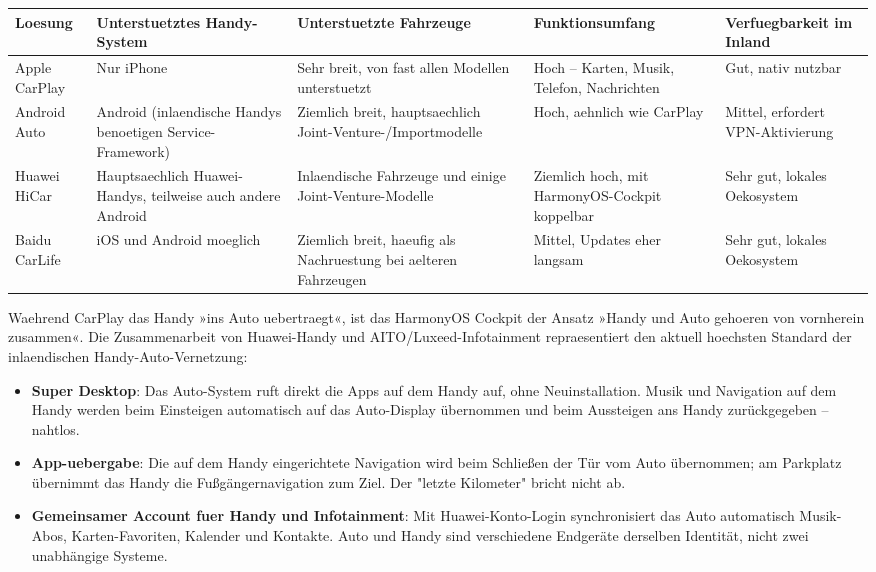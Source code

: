 \begin{center}
\begin{tabularx}{\linewidth}{|X|X|X|X|X|}
\hline
\textbf{Loesung} & \textbf{Unterstuetztes Handy-System} & \textbf{Unterstuetzte Fahrzeuge} & \textbf{Funktionsumfang} & \textbf{Verfuegbarkeit im Inland} \tabularnewline
\hline
Apple CarPlay & Nur iPhone & Sehr breit, von fast allen Modellen unterstuetzt & Hoch – Karten, Musik, Telefon, Nachrichten & Gut, nativ nutzbar \tabularnewline
Android Auto & Android (inlaendische Handys benoetigen Service-Framework) & Ziemlich breit, hauptsaechlich Joint-Venture-/Importmodelle & Hoch, aehnlich wie CarPlay & Mittel, erfordert VPN-Aktivierung \tabularnewline
Huawei HiCar & Hauptsaechlich Huawei-Handys, teilweise auch andere Android & Inlaendische Fahrzeuge und einige Joint-Venture-Modelle & Ziemlich hoch, mit HarmonyOS-Cockpit koppelbar & Sehr gut, lokales Oekosystem \tabularnewline
Baidu CarLife & iOS und Android moeglich & Ziemlich breit, haeufig als Nachruestung bei aelteren Fahrzeugen & Mittel, Updates eher langsam & Sehr gut, lokales Oekosystem \tabularnewline
\hline
\end{tabularx}
\end{center}


Waehrend CarPlay das Handy »ins Auto uebertraegt«, ist das HarmonyOS Cockpit der Ansatz »Handy und Auto gehoeren von vornherein zusammen«. Die Zusammenarbeit von Huawei-Handy und AITO/Luxeed-Infotainment repraesentiert den aktuell hoechsten Standard der inlaendischen Handy-Auto-Vernetzung:

\begin{itemize}
  \item \textbf{Super Desktop}: Das Auto-System ruft direkt die Apps auf dem Handy auf, ohne Neuinstallation. Musik und Navigation auf dem Handy werden beim Einsteigen automatisch auf das Auto-Display übernommen und beim Aussteigen ans Handy zurückgegeben – nahtlos.
  \item \textbf{App-uebergabe}: Die auf dem Handy eingerichtete Navigation wird beim Schließen der Tür vom Auto übernommen; am Parkplatz übernimmt das Handy die Fußgängernavigation zum Ziel. Der "letzte Kilometer" bricht nicht ab.
  \item \textbf{Gemeinsamer Account fuer Handy und Infotainment}: Mit Huawei-Konto-Login synchronisiert das Auto automatisch Musik-Abos, Karten-Favoriten, Kalender und Kontakte. Auto und Handy sind verschiedene Endgeräte derselben Identität, nicht zwei unabhängige Systeme.
\end{itemize}

